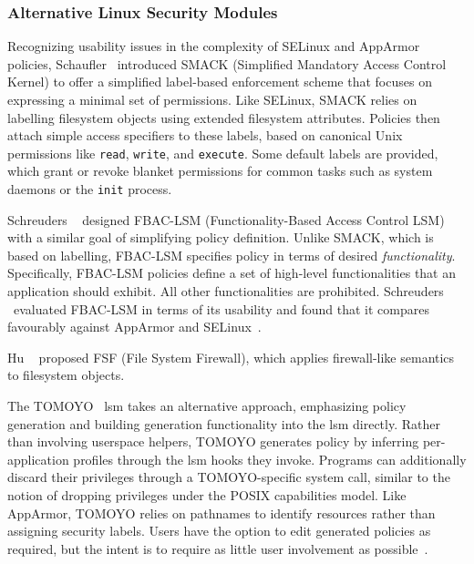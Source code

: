 \subsubsection*{Alternative Linux Security Modules}

Recognizing usability issues in the complexity of SELinux and AppArmor policies,
Schaufler~\cite{schaufler_smack} introduced SMACK (Simplified Mandatory Access Control Kernel) to
offer a simplified label-based enforcement scheme that focuses on expressing a minimal set
of permissions. Like SELinux, SMACK relies on labelling filesystem objects using extended
filesystem attributes. Policies then attach simple access specifiers to these labels, based
on canonical Unix permissions like \texttt{read}, \texttt{write}, and \texttt{execute}. Some
default labels are provided, which grant or revoke blanket permissions for common tasks such
as system daemons or the \texttt{init} process.

Schreuders \etal~\cite{schreuders2012_towards} designed FBAC-LSM (Functionality-Based
Access Control LSM) with a similar goal of simplifying policy definition. Unlike SMACK,
which is based on labelling, FBAC-LSM specifies policy in terms of desired
\textit{functionality}. Specifically, FBAC-LSM policies define a set of high-level
functionalities that an application should exhibit. All other functionalities are
prohibited. Schreuders \etal~evaluated FBAC-LSM in terms of its usability and found that
it compares favourably against AppArmor and SELinux~\cite{schreuders2012_towards}.

Hu \etal~\cite{hu2013_fsf} proposed FSF (File System Firewall), which applies firewall-like
semantics to filesystem objects. 

The TOMOYO~\cite{harada2004_tomoyo} \gls{lsm} takes an alternative approach, emphasizing
policy generation and building generation functionality into the \gls{lsm} directly.
Rather than involving userspace helpers, TOMOYO generates policy by inferring
per-application profiles through the \gls{lsm} hooks they invoke. Programs can
additionally discard their privileges through a TOMOYO-specific system call, similar to
the notion of dropping privileges under the POSIX capabilities model. Like AppArmor,
TOMOYO relies on pathnames to identify resources rather than assigning security labels.
Users have the option to edit generated policies as required, but the intent is to require
as little user involvement as possible~\cite{harada2004_tomoyo}.

